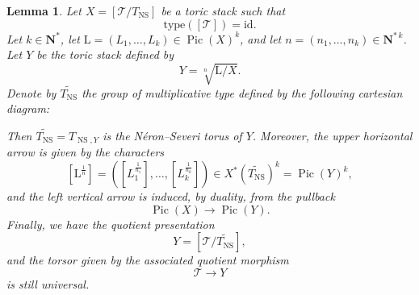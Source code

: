 \documentclass{proc-l}
\newcommand{\N}{\mathbf{N}}
\newcommand{\G}{\mathbf{G}}
\DeclareMathOperator{\Pic}{Pic}
\DeclareMathOperator{\NS}{NS}
\newcommand{\stackT}{\mathcal{T}}
\newtheorem{lemma}[theorem]{Lemma}
\theoremstyle{definition}
\theoremstyle{remark}
\numberwithin{equation}{section}
\begin{document}
\begin{lemma}\label{lemma_root_stack_type_torseur}
Let $X = [\stackT / T_{\NS}]$ be a toric stack such that
\[
\mathrm{type}([\stackT]) = \mathrm{id}.
\]
Let $k \in \N^*$, let $\mathrm L = (L_1,\dots,L_k) \in \Pic(X)^k$, and let
$n = (n_1,\dots,n_k) \in \N^{*\,k}$. Let $Y$ be the toric stack defined by
\[
Y = \sqrt[n]{\mathrm L / X}.
\]
Denote by $\widetilde{T_{\NS}}$ the group of multiplicative type defined by the
following cartesian diagram:
\begin{center}
\end{center}
Then $\widetilde{T_{\NS}} = T_{\NS,Y}$ is the Néron--Severi torus of $Y$.
Moreover, the upper horizontal arrow is given by the characters
\[
[\mathrm{L}^{\frac{1}{n}}]
=
\left(
[L_1^{\frac{1}{n_1}}],\dots,[L_k^{\frac{1}{n_k}}]
\right)
\in X^*(\widetilde{T_{\NS}})^k = \Pic(Y)^k,
\]
and the left vertical arrow is induced, by duality, from the pullback
\[
\Pic(X) \longrightarrow \Pic(Y).
\]
Finally, we have the quotient presentation
\[
Y = [\stackT / \widetilde{T_{\NS}}],
\]
and the torsor given by the associated quotient morphism
\[
\stackT \longrightarrow Y
\]
is still universal.
\end{lemma}
\end{document}
